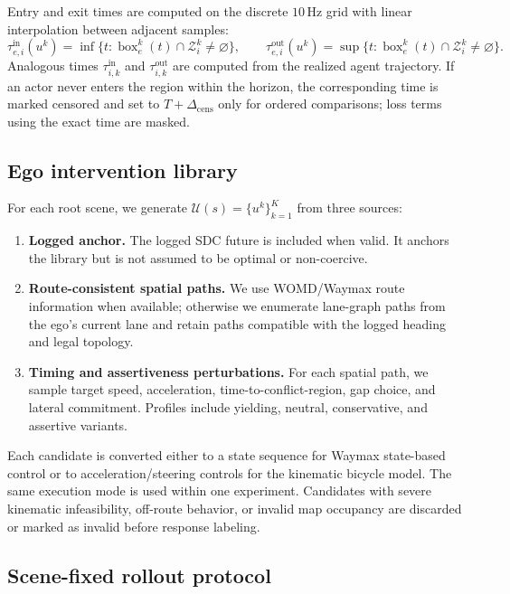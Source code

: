 \documentclass[10pt]{article}
\newcommand{\cU}{\mathcal{U}}
\newcommand{\cZ}{\mathcal{Z}}
\begin{document}
Entry and exit times are computed on the discrete \(10\,\mathrm{Hz}\) grid with linear interpolation between adjacent samples:
\[
\tau_{e,i}^{\mathrm{in}}(u^k)
=
\inf\{t:\operatorname{box}_e^k(t)\cap\cZ_i^k\neq\varnothing\},
\qquad
\tau_{e,i}^{\mathrm{out}}(u^k)
=
\sup\{t:\operatorname{box}_e^k(t)\cap\cZ_i^k\neq\varnothing\}.
\]
Analogous times \(\tau_{i,k}^{\mathrm{in}}\) and \(\tau_{i,k}^{\mathrm{out}}\) are computed from the realized agent trajectory. If an actor never enters the region within the horizon, the corresponding time is marked censored and set to \(T+\Delta_{\mathrm{cens}}\) only for ordered comparisons; loss terms using the exact time are masked.

\subsection{Ego intervention library}
\label{app:ego_library}

For each root scene, we generate \(\cU(s)=\{u^k\}_{k=1}^{K}\) from three sources:
\begin{enumerate}[leftmargin=*]
    \item \textbf{Logged anchor.} The logged SDC future is included when valid. It anchors the library but is not assumed to be optimal or non-coercive.
    \item \textbf{Route-consistent spatial paths.} We use WOMD/Waymax route information when available; otherwise we enumerate lane-graph paths from the ego's current lane and retain paths compatible with the logged heading and legal topology.
    \item \textbf{Timing and assertiveness perturbations.} For each spatial path, we sample target speed, acceleration, time-to-conflict-region, gap choice, and lateral commitment. Profiles include yielding, neutral, conservative, and assertive variants.
\end{enumerate}
Each candidate is converted either to a state sequence for Waymax state-based control or to acceleration/steering controls for the kinematic bicycle model. The same execution mode is used within one experiment. Candidates with severe kinematic infeasibility, off-route behavior, or invalid map occupancy are discarded or marked as invalid before response labeling.

\subsection{Scene-fixed rollout protocol}
\label{app:rollout_protocol}
\end{document}
